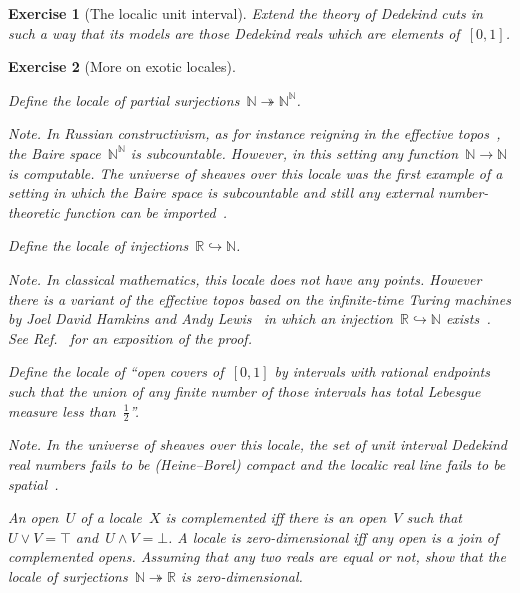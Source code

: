 \documentclass{ws-rv9x6}
\newtheorem{ex}{Exercise}
\newenvironment{exercise}[1]{
  \begin{ex}[#1]
}{\end{ex}}
\newcommand{\NN}{\mathbb{N}}
\newcommand{\RR}{\mathbb{R}}
\renewcommand{\_}{\mathpunct{.}}
\newcommand{\?}{\,{:}\,}
\begin{document}
\begin{exercise}{The localic unit interval}%
Extend the theory of Dede\-kind cuts in such a way that its models are those
Dedekind reals which are elements of~$[0,1]$.
\end{exercise}

\begin{exercise}{More on exotic locales}%
\label{ex:exotic-locales}%
\begin{alphlist}[(d)]
\item Define the locale of partial surjections~$\NN \twoheadrightarrow \NN^\NN$.\smallskip

{\scriptsize\emph{Note.} In Russian constructivism, as for instance reigning in
the ef{}fective topos~\cite{hyland:effective-topos,phoa:effective,bauer:c2c}, the Baire space~$\NN^\NN$ is subcountable.
However, in this setting any function~$\NN \to \NN$ is computable.
The universe of sheaves over this locale was the first example of a setting in
which the Baire space is subcountable and still any external number-theoretic
function can be imported~\cite[Section~4.3]{scedrov:forcing}.\par}
\item Define the locale of injections~$\RR \hookrightarrow \NN$.\smallskip

{\scriptsize\emph{Note.} In classical mathematics, this locale does not have
any points. However there is a variant of the ef{}fective topos based on the
infinite-time Turing machines by Joel David Hamkins and Andy
Lewis~\cite{hamkins-lewis:ittm} in which an injection~$\RR \hookrightarrow \NN$
exists~\cite{bauer:injection}. See
Ref.~\cite[Section~2.2]{blechschmidt:custom-tailored} for an exposition of the
proof.\par}

\item Define the locale of ``open covers of~$[0,1]$ by intervals with rational
endpoints such that the union of any finite number of those intervals has total
Lebesgue measure less than~$\frac{1}{2}$''.\smallskip

{\scriptsize\emph{Note.} In the universe of sheaves over this locale, the set
of unit interval Dedekind real numbers fails to be (Heine--Borel) compact and
the localic real line fails to be
spatial~\cite[Example~D4.7.13]{johnstone:elephant}.\par}
\item An open~$U$ of a locale~$X$ is \emph{complemented} iff there is an
open~$V$ such that~$U \vee V = \top$ and~$U \wedge V = \bot$. A locale is
\emph{zero-dimensional} iff any open is a join of complemented opens. Assuming
that any two reals are equal or not, show that the locale of surjections~$\NN
\twoheadrightarrow \RR$ is zero-dimensional.
\end{alphlist}
\end{exercise}
\end{document}
